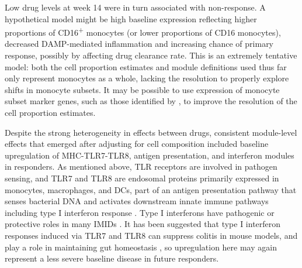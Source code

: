 Low drug levels at week 14 were in turn associated with non-response.
A hypothetical model might be high baseline  expression reflecting 
higher proportions of CD16\textsuperscript{+} monocytes (or lower proportions of CD16\textsuperscript{\textminus} monocytes),
decreased \gls{DAMP}-mediated inflammation and increasing chance of primary response, possibly by affecting drug clearance rate.
This is an extremely tentative model:
both the cell proportion estimates and module definitions used thus far only represent monocytes as a whole,
lacking the resolution to properly explore shifts in monocyte subsets.
It may be possible to use expression of monocyte subset marker genes, such as those identified by \textcite{villani2017SinglecellRNAseqReveals}, to improve the resolution of the cell proportion estimates.

Despite the strong heterogeneity in effects between drugs, 
consistent module-level effects that emerged after adjusting for cell composition included
baseline upregulation of MHC-TLR7-TLR8, antigen presentation, and interferon modules in responders.
As mentioned above, \gls{TLR} receptors are involved in pathogen sensing, and TLR7 and TLR8 are endosomal proteins primarily expressed in monocytes, macrophages, and \glspl{DC},
part of an antigen presentation pathway that senses bacterial DNA and activates downstream innate immune pathways including type I interferon response \autocite{cervantes2012TLR8ForgottenRelative}.
Type I interferons have pathogenic or protective roles in many \glspl{IMID} \autocite{ivashkiv2014RegulationTypeInterferon}.
It has been suggested that type I interferon responses induced via TLR7 and TLR8 can suppress colitis in mouse models, and play a role in maintaining gut homeostasis \autocite{lu2018TolllikeReceptorsInflammatory,corridoni2018EmergingMechanismsInnate},
so upregulation here may again represent a less severe baseline disease in future responders.
%

